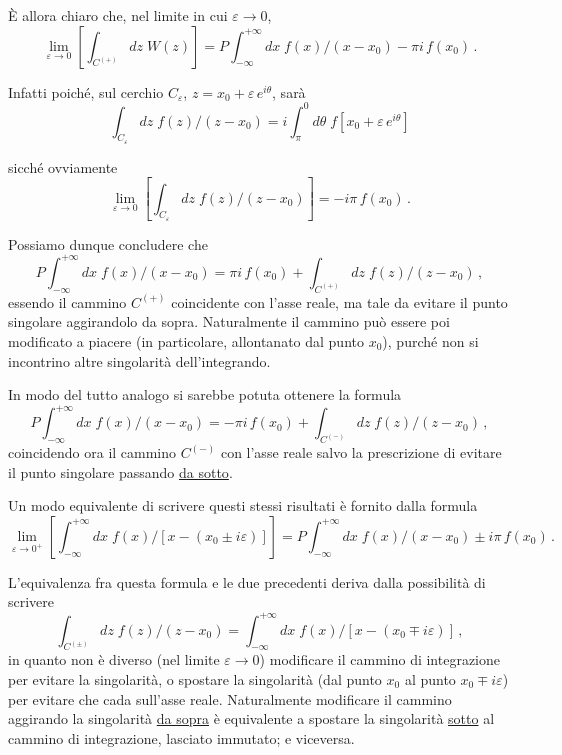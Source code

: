 \documentclass[11pt, a4paper]{book}
\numberwithin{equation}{section}
\begin{document}
È allora chiaro che, nel limite in cui $\varepsilon \to 0$,
\begin{equation}
\lim_{\varepsilon \to 0} \left[\int_{C^{(+)}} dz\; W(z)\right] = P\!\int_{-\infty}^{+\infty} dx\; f(x)/(x-x_0) - \pi i\, f(x_0)\,. \tag{4}
\end{equation}

Infatti poiché, sul cerchio $C_\varepsilon$, $z = x_0 + \varepsilon\,e^{i\theta}$, sarà
\[
\int_{C_\varepsilon} dz\; f(z)/(z-x_0) = i\int_{\pi}^{0} d\theta\; f\!\left[x_0 + \varepsilon\,e^{i\theta}\right]
\]

sicché ovviamente
\[
\lim_{\varepsilon \to 0} \left[\int_{C_\varepsilon} dz\; f(z)/(z-x_0)\right] = -i\pi\, f(x_0)\,.
\]

Possiamo dunque concludere che
\begin{equation}
P\!\int_{-\infty}^{+\infty} dx\; f(x)/(x-x_0) = \pi i\, f(x_0) + \int_{C^{(+)}} dz\; f(z)/(z-x_0)\,, \tag{5}
\end{equation}
essendo il cammino $C^{(+)}$ coincidente con l'asse reale, ma tale da evitare il punto singolare aggirando\-lo da sopra. Naturalmente il cammino può essere poi modificato a piacere (in particolare, allontanato dal punto $x_0$), purché non si incontrino altre singolarità dell'integrando.

In modo del tutto analogo si sarebbe potuta ottenere la formula
\begin{equation}
P\!\int_{-\infty}^{+\infty} dx\; f(x)/(x-x_0) = -\pi i\, f(x_0) + \int_{C^{(-)}} dz\; f(z)/(z-x_0)\,, \tag{6}
\end{equation}
coincidendo ora il cammino $C^{(-)}$ con l'asse reale salvo la prescrizione di evitare il punto singolare passando \uline{da sotto}.

Un modo equivalente di scrivere questi stessi risultati è fornito dalla formula
\begin{equation}
\lim_{\varepsilon \to 0^+} \left[\int_{-\infty}^{+\infty} dx\; f(x) \big/ \left[x - (x_0 \pm i\varepsilon)\right]\right] = P\!\int_{-\infty}^{+\infty} dx\; f(x)/(x-x_0) \pm i\pi\, f(x_0)\,. \tag{7}
\end{equation}

L'equivalenza fra questa formula e le due precedenti deriva dalla possibilità di scrivere
\[
\int_{C^{(\pm)}} dz\; f(z)/(z-x_0) = \int_{-\infty}^{+\infty} dx\; f(x) \big/ \left[x - (x_0 \mp i\varepsilon)\right]\,,
\]
in quanto non è diverso (nel limite $\varepsilon \to 0$) modificare il cammino di integrazione per evitare la singolarità, o spostare la singolarità (dal punto $x_0$ al punto $x_0 \mp i\varepsilon$) per evitare che cada sull'asse reale. Naturalmente modificare il cammino aggirando la singolarità \uline{da sopra} è equivalente a spostare la singolarità \uline{sotto} al cammino di integrazione, lasciato immutato; e viceversa.
\end{document}
